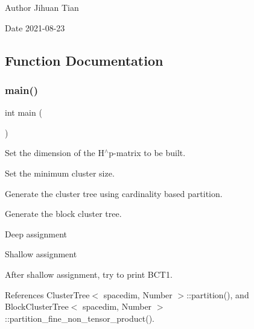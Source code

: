 \begin{DoxyAuthor}{Author}
Jihuan Tian 
\end{DoxyAuthor}
\begin{DoxyDate}{Date}
2021-\/08-\/23 
\end{DoxyDate}


\subsection{Function Documentation}
\mbox{\label{bct-overloaded-assignment_8cc_ae66f6b31b5ad750f1fe042a706a4e3d4}} 
\subsubsection{\texorpdfstring{main()}{main()}}
{\footnotesize\ttfamily int main (\begin{DoxyParamCaption}{ }\end{DoxyParamCaption})}

Set the dimension of the H$^\wedge$p-\/matrix to be built.

Set the minimum cluster size.

Generate the cluster tree using cardinality based partition.

Generate the block cluster tree.

Deep assignment

Shallow assignment

After shallow assignment, try to print B\+C\+T1.

References Cluster\+Tree$<$ spacedim, Number $>$\+::partition(), and Block\+Cluster\+Tree$<$ spacedim, Number $>$\+::partition\+\_\+fine\+\_\+non\+\_\+tensor\+\_\+product().

